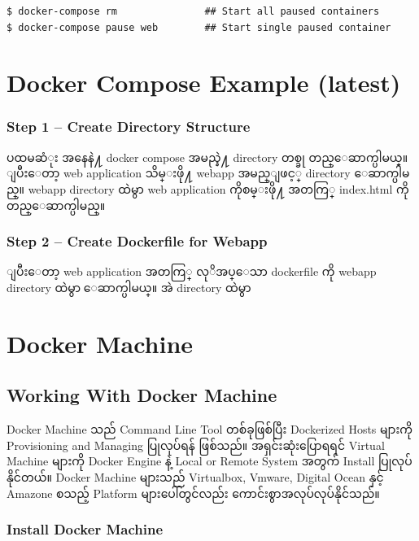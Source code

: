 \documentclass{article}
\begin{document}
\begin{verbatim}
$ docker-compose rm               ## Start all paused containers
$ docker-compose pause web        ## Start single paused container
\end{verbatim}

\section{Docker Compose Example
(latest)}\label{docker-compose-example-latest}

\subsubsection{Step 1 -- Create Directory Structure
}\label{step-1-create-directory-structure}

ပထမဆံုး အနေနဲ႔ docker compose အမည္နဲ႔ directory တစ္ခု တည္ေဆာက္ပါမယ္။
ျပီးေတာ့ web application သိမ္းဖို႔ webapp အမည္ျဖင့္ directory
ေဆာက္ပါမည္။ webapp directory ထဲမွာ web application ကိုစမ္းဖို႔ အတကြ္
index.html ကို တည္ေဆာက္ပါမည္။

\subsubsection{Step 2 -- Create Dockerfile for Webapp
}\label{step-2-create-dockerfile-for-webapp}

ျပီးေတာ့ web application အတကြ္ လုိအပ္ေသာ dockerfile ကို webapp directory
ထဲမွာ ေဆာက္ပါမယ္။ အဲ directory ထဲမွာ

\section{Docker Machine}\label{docker-machine}

\subsection{Working With Docker
Machine}\label{working-with-docker-machine}

Docker Machine သည် Command Line Tool တစ်ခုဖြစ်ပြီး Dockerized Hosts
များကို Provisioning and Managing ပြုလုပ်ရန် ဖြစ်သည်။ အရှင်းဆုံးပြောရရင်
Virtual Machine များကို Docker Engine နဲ့ Local or Remote System အတွက်
Install ပြုလုပ်နိုင်တယ်။ Docker Machine များသည် Virtualbox, Vmware,
Digital Ocean နှင့် Amazone စသည့် Platform များပေါ်တွင်လည်း
ကောင်းစွာအလုပ်လုပ်နိုင်သည်။

\subsubsection{Install Docker Machine}\label{install-docker-machine}
\end{document}

